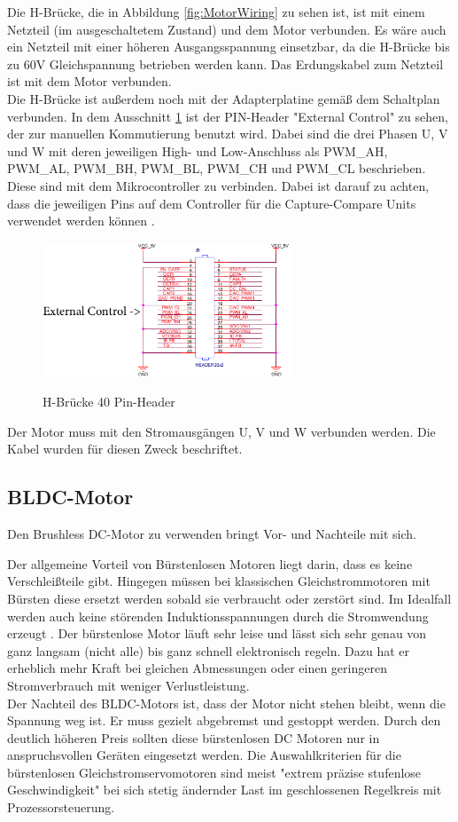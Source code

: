 Die H-Brücke, die in Abbildung \ref{fig:MotorWiring} zu sehen ist, ist mit einem Netzteil (im ausgeschaltetem Zustand) und dem Motor verbunden. Es wäre auch ein Netzteil mit einer höheren Ausgangsspannung einsetzbar, da die H-Brücke bis zu 60V Gleichspannung betrieben werden kann. Das Erdungskabel zum Netzteil ist mit dem Motor verbunden. \\
Die H-Brücke ist außerdem noch mit der Adapterplatine gemäß dem Schaltplan verbunden. In dem Ausschnitt \ref{fig:TIWiring} ist der PIN-Header "External Control" zu sehen, der zur manuellen Kommutierung benutzt wird. Dabei sind die drei Phasen U, V und W mit deren jeweiligen High- und Low-Anschluss als PWM\_AH, PWM\_AL, PWM\_BH, PWM\_BL, PWM\_CH und PWM\_CL beschrieben. Diese sind mit dem Mikrocontroller zu verbinden. Dabei ist darauf zu achten, dass die jeweiligen Pins auf dem Controller für die Capture-Compare Units verwendet werden können \cite{InfineonTechnologies2016}.
\begin{figure}
    \includegraphics[width=0.66\textwidth]{motor/TI_Wiring.png}
    \caption{H-Brücke 40 Pin-Header}
    \quelle \cite{Instruments2014}
    \label{fig:TIWiring}
\end{figure}
Der Motor muss mit den Stromausgängen U, V und W verbunden werden. Die Kabel wurden für diesen Zweck beschriftet. \\

\subsection{BLDC-Motor}
Den Brushless DC-Motor zu verwenden bringt Vor- und Nachteile mit sich.

Der allgemeine Vorteil von Bürstenlosen Motoren liegt darin, dass es keine Verschleißteile gibt.
Hingegen müssen bei klassischen Gleichstrommotoren mit Bürsten diese ersetzt werden sobald sie verbraucht oder zerstört sind. Im Idealfall werden auch keine störenden Induktionsspannungen durch die Stromwendung erzeugt \cite{Babiel2014}. Der bürstenlose Motor läuft sehr leise und lässt sich sehr genau von ganz langsam (nicht alle) bis ganz schnell elektronisch regeln. Dazu hat er erheblich mehr Kraft bei gleichen Abmessungen oder einen geringeren Stromverbrauch mit weniger Verlustleistung. \\
Der Nachteil des BLDC-Motors ist, dass der Motor nicht stehen bleibt, wenn die Spannung weg ist. Er muss gezielt abgebremst und gestoppt werden.
Durch den deutlich höheren Preis sollten diese bürstenlosen DC Motoren nur in anspruchsvollen Geräten eingesetzt werden.
Die Auswahlkriterien für die bürstenlosen Gleichstromservomotoren sind meist "extrem präzise stufenlose Geschwindigkeit" bei sich stetig ändernder Last im geschlossenen Regelkreis mit Prozessorsteuerung.

